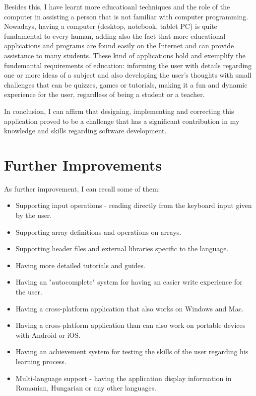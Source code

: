 \documentclass[12pt,a4paper,twoside]{report}
\begin{document}
Besides this, I have learnt more educatioanl techniques and the role of the computer in assisting a person that is not familiar with computer programming. Nowadays, having a computer (desktop, notebook, tablet PC) is quite fundamental to every human, adding also the fact that more educational applications and programs are found easily on the Internet and can provide assistance to many students. These kind of applications hold and exemplify the fundemantal requirements of education: informing the user with details regarding one or more ideas of a subject and also developing the user's thoughts with small challenges that can be quizzes, games or tutorials, making it a fun and dynamic experience for the user, regardless of being a student or a teacher.

In conclusion, I can affirm that designing, implementing and correcting this application proved to be a challenge that has a significant contribution in my knowledge and skills regarding software development.
\section{Further Improvements}
As further improvement, I can recall some of them:
\begin{itemize}
	\item Supporting input operations - reading directly from the keyboard input given by the user.
	\item Supporting array definitions and operations on arrays.
	\item Supporting header files and external libraries specific to the language.
	\item Having more detailed tutorials and guides.
	\item Having an "autocomplete" system for having an easier write experience for the user.
	\item Having a cross-platform application that also works on Windows and Mac. 
	\item Having a cross-platform application than can also work on portable devices with Android or iOS.
	\item Having an achievement system for testing the skills of the user regarding his learning process. 
	\item Multi-language support - having the application display information in Romanian, Hungarian or any other languages. 
\end{itemize}


 


\end{document}

